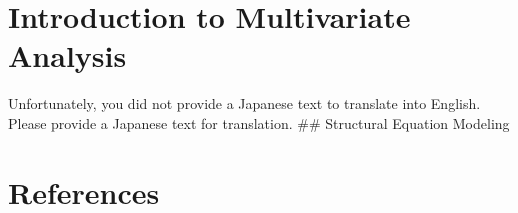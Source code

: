 \documentclass[
  a4paper,
]{book}
\begin{document}

\chapter{Introduction to Multivariate
Analysis}\label{introduction-to-multivariate-analysis}

Unfortunately, you did not provide a Japanese text to translate into
English. Please provide a Japanese text for translation. \#\# Structural
Equation Modeling


\chapter*{References}\label{references}


\printbibliography[heading=none]


\backmatter
\end{document}
